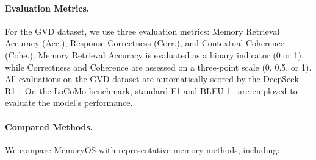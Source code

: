 \documentclass[11pt]{article}
\begin{document}
\paragraph{Evaluation Metrics.} 
For the GVD dataset, we use three evaluation metrics: Memory Retrieval Accuracy (Acc.), Response Correctness (Corr.), and Contextual Coherence (Cohe.).
Memory Retrieval Accuracy is evaluated as a binary indicator (0 or 1), while Correctness and Coherence are assessed on a three-point scale (0, 0.5, or 1). All evaluations on the GVD dataset are automatically scored by the DeepSeek-R1~\cite{deepseekai2025deepseekr1incentivizingreasoningcapability}. On the LoCoMo benchmark, standard F1 and BLEU-1~\cite{papineni2002bleu} are employed to evaluate the model’s performance.




\paragraph{Compared Methods.}
We compare MemoryOS with representative memory methods, including:
\end{document}
